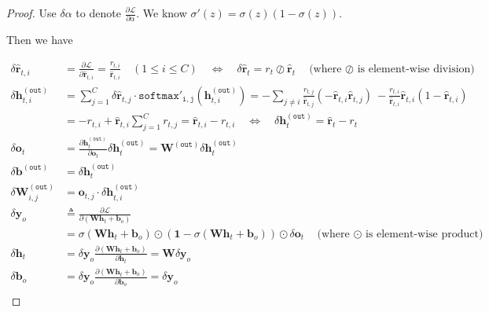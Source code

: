 \documentclass{article}
\renewcommand{\bf}[1]{\mathbf{#1}}
\renewcommand{\tt}[1]{\mathtt{#1}}
\begin{document}
\vspace{2.7em}
\begin{proof}
    Use $\delta\alpha$ to denote $\frac{\partial \mathcal{L}}{\partial \alpha}$. We know $\sigma'(z)=\sigma(z)\left(1-\sigma(z)\right)$.
    
    \hspace{1.3em}
    Then we have
    
    \vspace{-2.5em}
    \begin{align*}
        \delta\hat{\bf{r}}_{t,i} &= \frac{\partial\mathcal{L}}{\partial\hat{\bf{r}}_{t,i}} = \frac{r_{t,i}}{\hat{\bf{r}}_{t,i}}\quad(1\le i\le C)\quad\Longleftrightarrow\quad \delta\hat{\bf{r}}_t = r_{t}\oslash\hat{\bf{r}}_t\quad\text{(where $\oslash$ is element-wise division)}\qquad\\
        \delta\bf{h}_{t,i}^{\tt{(out)}} &= \sum_{j=1}^C \delta\hat{\bf{r}}_{t,j}\cdot\tt{softmax'_{i,j}}\left(\bf{h}_{t,i}^{\tt{(out)}}\right) = -\sum_{j\neq i}\frac{r_{t,j}}{\hat{\bf{r}}_{t,j}}(-\hat{\bf{r}}_{t,i}\hat{\bf{r}}_{t,j})\ - \frac{r_{t,i}}{\hat{\bf{r}}_{t,i}}\hat{\bf{r}}_{t,i}\left(1-\hat{\bf{r}}_{t,i}\right) \\
        &= -r_{t,i}+\hat{\bf{r}}_{t,i}\sum_{j=1}^Cr_{t,j} = \hat{\bf{r}}_{t,i}-r_{t,i} \quad\Longleftrightarrow\quad \delta\bf{h}_t^{\tt{(out)}} = \hat{\bf{r}}_t - r_t  \\
        \delta\bf{o}_t &= \frac{\partial \bf{h}_{t}^{\tt{(out)}}}{\partial \bf{o}_t}\delta\bf{h}_{t}^{\tt{(out)}} = \bf{W}^{\tt{(out)}}\delta\bf{h}_{t}^{\tt{(out)}} \\
        \delta\bf{b}^{\tt{(out)}} &= \delta\bf{h}_{t}^{\tt{(out)}}\\
        \delta\bf{W}_{i,j}^{\tt{(out)}} &= \bf{o}_{t,j}\cdot\delta\bf{h}_{t,i}^{\tt{(out)}} \\
        \delta\bf{y}_o &\triangleq \frac{\partial\mathcal{L}}{\partial\left(\bf{W}\bf{h}_t+\bf{b}_o\right)} \\
        &=\sigma(\bf{W}\bf{h}_t+\bf{b}_o)\odot\left(\bf{1}-\sigma\left(\bf{W}\bf{h}_t+\bf{b}_o\right)\right)\odot\delta\bf{o}_t\quad \text{(where $\odot$ is element-wise product)}\\
        \delta\bf{h}_t &= \delta\bf{y}_o\frac{\partial\left(\bf{W}\bf{h}_{t}+\bf{b}_o\right)}{\partial \bf{h}_t} = \bf{W}\delta\bf{y}_o \\
        \delta\bf{b}_o &= \delta\bf{y}_o\frac{\partial\left(\bf{W}\bf{h}_{t}+\bf{b}_o\right)}{\partial \bf{b}_o} = \delta\bf{y}_o \\

\end{align*}
\end{proof}
\end{document}
